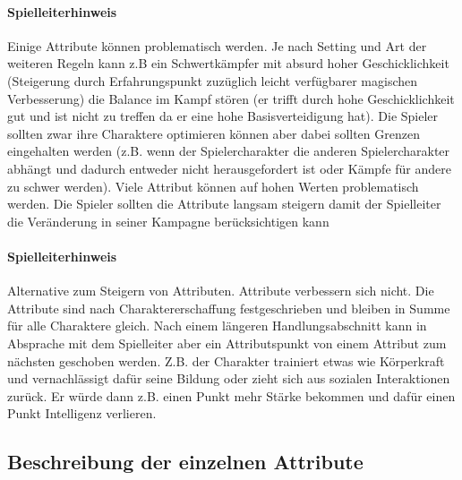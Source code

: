 \documentclass{article}
\begin{document}
\begin{mdframed}[hidealllines=true, backgroundcolor=black!10]
\paragraph{Spielleiterhinweis}

Einige Attribute können problematisch werden. Je nach Setting und Art der weiteren Regeln kann z.B ein
Schwertkämpfer mit absurd hoher Geschicklichkeit (Steigerung durch Erfahrungspunkt zuzüglich leicht verfügbarer
magischen Verbesserung) die Balance im Kampf stören (er trifft durch hohe Geschicklichkeit gut und ist nicht zu
treffen da er eine hohe Basisverteidigung hat). Die Spieler sollten zwar ihre Charaktere optimieren können aber
dabei sollten Grenzen eingehalten werden (z.B. wenn der Spielercharakter die anderen Spielercharakter abhängt und
dadurch entweder nicht herausgefordert ist oder Kämpfe für andere zu schwer werden). Viele Attribut können auf
hohen Werten problematisch werden. Die Spieler sollten die Attribute langsam steigern damit der Spielleiter die
Veränderung in seiner Kampagne berücksichtigen kann

\end{mdframed}
\begin{mdframed}[hidealllines=true, backgroundcolor=black!10]
\paragraph{Spielleiterhinweis}

Alternative zum Steigern von Attributen. Attribute verbessern sich nicht.
Die Attribute sind nach Charaktererschaffung festgeschrieben und bleiben in Summe für alle Charaktere gleich.
Nach einem längeren Handlungsabschnitt kann in Absprache mit dem Spielleiter aber ein Attributspunkt von einem
Attribut zum nächsten geschoben werden. Z.B. der Charakter trainiert etwas wie Körperkraft und vernachlässigt dafür
seine Bildung oder zieht sich aus sozialen Interaktionen zurück. Er würde dann z.B. einen Punkt mehr Stärke bekommen
und dafür einen Punkt Intelligenz verlieren.

\end{mdframed}
\begin{center}
\subsection{Beschreibung der einzelnen Attribute}
\end{center}
\end{document}
